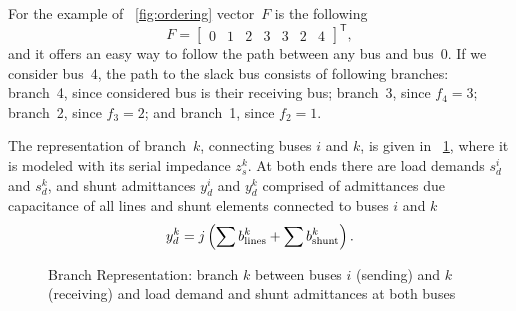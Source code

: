 \documentclass[12pt]{article}
\newcommand{\trans}[1]{{#1}^{\ensuremath{\mathsf{T}}}}  %
\numberwithin{equation}{section}
\numberwithin{table}{section}
\numberwithin{figure}{section}
\begin{document}
For the example of \figurename~\ref{fig:ordering} vector~$F$ is the following
\begin{equation*}
  F = \trans{\left[\begin{array}{ccccccc}
    0 & 1 & 2 & 3 & 3 & 2 & 4
  \end{array}\right]},
\end{equation*}
and it offers an easy way to follow the path between any bus and bus~0. If we consider bus~4, the path to the slack bus consists of following branches: branch~4, since considered bus is their receiving bus; branch~3, since $f_4 = 3$; branch~2, since $f_3 = 2$; and branch~1, since $f_2 = 1$.

The representation of branch~$k$, connecting buses $i$ and $k$, is given in \figurename~\ref{fig:branch_rep}, where it is modeled with its serial impedance $z_s^k$. At both ends there are load demands $s_d^i$ and $s_d^k$, and shunt admittances $y_d^i$ and $y_d^k$ comprised of admittances due capacitance of all lines and shunt elements connected to buses $i$ and $k$
\begin{equation*}
  y_d^k = j \left( \sum b_{\rm lines}^k + \sum b_{\rm shunt}^k \right).
\end{equation*}


\begin{figure}[htb]
  \centering
  \caption{Branch Representation: branch $k$ between buses $i$ (sending) and $k$ (receiving) and load demand and shunt admittances at both buses}
  \label{fig:branch_rep}
\end{figure}
\end{document}
